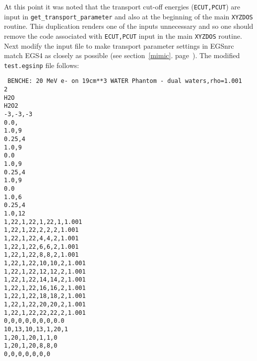 At this point it was noted that the 
transport cut-off energies ({\tt ECUT,PCUT}) 
are input in {\tt get\_transport\_parameter} 
and also at the beginning of the main {\tt XYZDOS} routine. This 
duplication renders one of the inputs unnecessary and so one should remove 
the code associated with {\tt ECUT,PCUT} input in the 
main {\tt XYZDOS} routine. Next modify the input file to 
make transport parameter settings in EGSnrc match EGS4 
as closely as possible (see section~\ref{mimic}. page~\pageref{mimic}). The 
modified {\tt test.egsinp} file follows:
\begin{flushleft}{\tt
BENCHE:  20 MeV e- on 19cm**3 WATER Phantom - dual waters,rho=1.001 \\
2 \\
H2O \\
H2O2 \\
-3,-3,-3 \\
0.0, \\
1.0,9 \\
0.25,4 \\
1.0,9 \\
0.0 \\
1.0,9 \\
0.25,4 \\
1.0,9 \\
0.0 \\
1.0,6 \\
0.25,4 \\
1.0,12 \\
1,22,1,22,1,22,1,1.001 \\
1,22,1,22,2,2,2,1.001 \\
1,22,1,22,4,4,2,1.001 \\
1,22,1,22,6,6,2,1.001 \\
1,22,1,22,8,8,2,1.001 \\
1,22,1,22,10,10,2,1.001 \\
1,22,1,22,12,12,2,1.001 \\
1,22,1,22,14,14,2,1.001 \\
1,22,1,22,16,16,2,1.001 \\
1,22,1,22,18,18,2,1.001 \\
1,22,1,22,20,20,2,1.001 \\
1,22,1,22,22,22,2,1.001 \\
0,0,0,0,0,0,0,0.0 \\
10,13,10,13,1,20,1 \\
1,20,1,20,1,1,0 \\
1,20,1,20,8,8,0 \\
0,0,0,0,0,0,0 \\
}
\end{flushleft}
